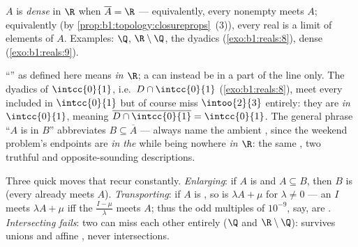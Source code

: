 \begin{definition}\label{def:b1:topology:dense}
$A$ is \emph{dense} in $\R$ when $\overline A = \R$
--- equivalently, every nonempty   meets $A$;
equivalently (by \cref{prop:b1:topology:closureprops}~(3)), every
real is a limit of elements of $A$. Examples: $\Q$, $\R \setminus
\Q$, the dyadics (\cref{exo:b1:reals:8}), dense 
(\cref{exo:b1:reals:9}).
\end{definition}

\begin{example}\label{ex:b1:topology:relativedensity}
``'' as defined here means  \emph{in $\R$}; a  can
instead be  in a part of the line only. The dyadics of
$\intcc{0}{1}$, i.e.\ $D \cap \intcc{0}{1}$
(\cref{exo:b1:reals:8}), meet every   included in
$\intcc{0}{1}$ but of course miss $\intoo{2}{3}$ entirely: they
are  \emph{in} $\intcc{0}{1}$, meaning $\overline{D \cap
\intcc{0}{1}} = \intcc{0}{1}$. The general phrase ``$A$ is 
in $B$'' abbreviates $B \subseteq \overline A$ --- always name
the ambient , since the weekend problem's endpoints are 
\emph{in the } while being nowhere  \emph{in
$\R$}: the same , two truthful and opposite-sounding
descriptions.
\end{example}

\begin{example}\label{ex:b1:topology:densitytricks}
Three quick moves that recur constantly. \emph{Enlarging}: if
$A$ is  and $A \subseteq B$, then $B$ is  (every
 already meets $A$). \emph{Transporting}: if $A$ is
, so is $\lambda A + \mu$ for $\lambda \neq 0$ --- an
 $I$ meets $\lambda A + \mu$ iff the 
$\frac{I - \mu}{\lambda}$ meets $A$; thus the odd multiples of
$10^{-9}$, say, are . \emph{Intersecting fails}: two 
 can miss each other entirely ($\Q$ and $\R \setminus \Q$):
 survives unions and affine , never intersections.
\end{example}

